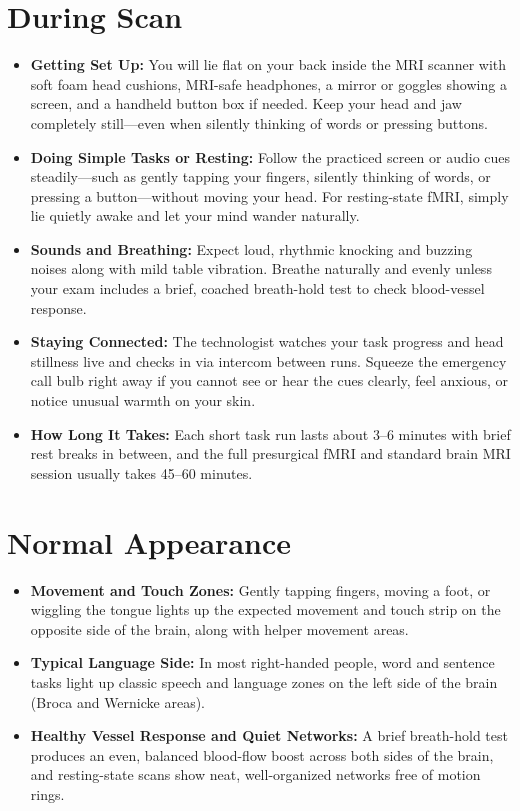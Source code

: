 \section{During Scan}

\begin{itemize}
    \item \textbf{Getting Set Up:} You will lie flat on your back inside the MRI scanner with soft foam head cushions, MRI-safe headphones, a mirror or goggles showing a screen, and a handheld button box if needed. Keep your head and jaw completely still---even when silently thinking of words or pressing buttons.
    \item \textbf{Doing Simple Tasks or Resting:} Follow the practiced screen or audio cues steadily---such as gently tapping your fingers, silently thinking of words, or pressing a button---without moving your head. For resting-state fMRI, simply lie quietly awake and let your mind wander naturally.
    \item \textbf{Sounds and Breathing:} Expect loud, rhythmic knocking and buzzing noises along with mild table vibration. Breathe naturally and evenly unless your exam includes a brief, coached breath-hold test to check blood-vessel response.
    \item \textbf{Staying Connected:} The technologist watches your task progress and head stillness live and checks in via intercom between runs. Squeeze the emergency call bulb right away if you cannot see or hear the cues clearly, feel anxious, or notice unusual warmth on your skin.
    \item \textbf{How Long It Takes:} Each short task run lasts about 3--6 minutes with brief rest breaks in between, and the full presurgical fMRI and standard brain MRI session usually takes 45--60 minutes.
\end{itemize}

\section{Normal Appearance}

\begin{itemize}
    \item \textbf{Movement and Touch Zones:} Gently tapping fingers, moving a foot, or wiggling the tongue lights up the expected movement and touch strip on the opposite side of the brain, along with helper movement areas.
    \item \textbf{Typical Language Side:} In most right-handed people, word and sentence tasks light up classic speech and language zones on the left side of the brain (Broca and Wernicke areas).
    \item \textbf{Healthy Vessel Response and Quiet Networks:} A brief breath-hold test produces an even, balanced blood-flow boost across both sides of the brain, and resting-state scans show neat, well-organized networks free of motion rings.
\end{itemize}

